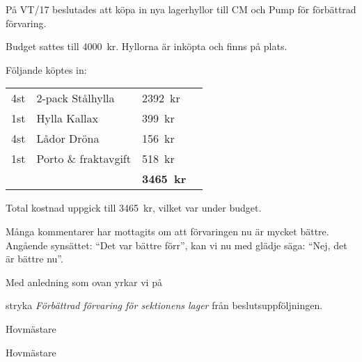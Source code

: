 \documentclass[../_main/handlingar.tex]{subfiles}
\begin{document}

På VT/17 beslutades att köpa in nya lagerhyllor till CM och Pump för förbättrad förvaring.

Budget sattes till \SI{4000}{kr}. Hyllorna är inköpta och finns på plats.

Följande köptes in:
\begin{table}[H]
\begin{tabular}{l l l r}
    4st & 2-pack Stålhylla & \SI{2392}{kr}\\
    1st & Hylla Kallax & \SI{399}{kr}\\
    4st & Lådor Dröna & \SI{156}{kr}\\
    1st & Porto \& fraktavgift & \SI{518}{kr}\\
    \hline
    & & \textbf{\SI{3465}{kr}}\\
\end{tabular}
\end{table}

Total kostnad uppgick till \SI{3465}{kr}, vilket var under budget.

Många kommentarer har mottagits om att förvaringen nu är mycket bättre. Angående
synsättet: ``Det var bättre förr'', kan vi nu med glädje säga: ``Nej, det är bättre nu''.

Med anledning som ovan yrkar vi på

\begin{attsatser}
    \att stryka \emph{Förbättrad förvaring för sektionens lager} från beslutsuppföljningen.
\end{attsatser}

\begin{signatures}{2}
    \mvh
    \signature{Sanna Nordberg}{Hovmästare}
    \signature{Matilda Dahlström}{Hovmästare}
\end{signatures}
\end{document}
